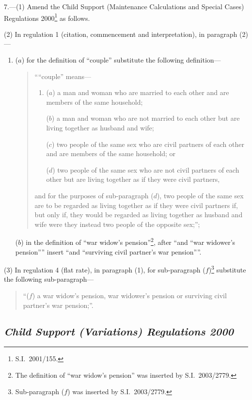 \documentclass[12pt,a4paper]{article}
\begin{document}
7.---(1)  Amend the Child Support (Maintenance Calculations and Special Cases) Regulations 2000\footnote{S.I.\ 2001/155.} as follows.

(2) In regulation 1 (citation, commencement and interpretation), in paragraph (2)—
\begin{enumerate}\item[]
($a$) for the definition of “couple” substitute the following definition—
\begin{quotation}
““couple” means—
\begin{enumerate}\item[]
($a$) 
a man and woman who are married to each other and are members of the same household;

($b$) 
a man and woman who are not married to each other but are living together as husband and wife;

($c$) 
two people of the same sex who are civil partners of each other and are members of the same household; or

($d$) 
two people of the same sex who are not civil partners of each other but are living together as if they were civil partners,
\end{enumerate}
and for the purposes of sub-paragraph ($d$), two people of the same sex are to be regarded as living together as if they were civil partners if, but only if, they would be regarded as living together as husband and wife were they instead two people of the opposite sex;”;
\end{quotation}

($b$) in the definition of “war widow’s pension”\footnote{The definition of “war widow’s pension” was inserted by S.I.\ 2003/2779.}, after “and “war widower’s pension”” insert “and “surviving civil partner’s war pension””.
\end{enumerate}

(3) In regulation 4 (flat rate), in paragraph (1), for sub-paragraph ($f$)\footnote{Sub-paragraph ($f$) was inserted by S.I.\ 2003/2779.} substitute the following sub-paragraph—
\begin{quotation}
“($f$) a war widow’s pension, war widower’s pension or surviving civil partner’s war pension;”.
\end{quotation}

\subsection*{\itshape Child Support (Variations) Regulations 2000}
\end{document}
